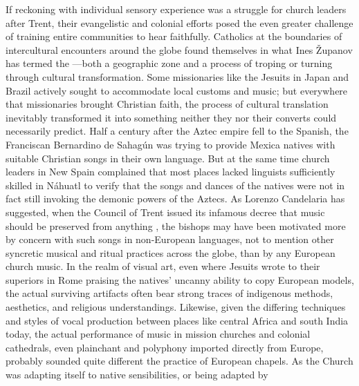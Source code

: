 If reckoning with individual sensory experience was a struggle for church
leaders after Trent, their evangelistic and colonial efforts posed the even
greater challenge of training entire communities to hear faithfully.
Catholics at the boundaries of intercultural encounters around the globe found
themselves in what Ines Županov has termed the ---both a geographic zone and a process of troping or turning through
cultural transformation.%
    \Autocite{Zupanov:MissionaryTropics}
Some missionaries like the Jesuits in Japan and Brazil actively sought to
accommodate local customs and music; but everywhere that missionaries brought
Christian faith, the process of cultural translation inevitably transformed it
into something neither they nor their converts could necessarily predict.%
    \Autocites
    {Bailey:Art}
    {Fromont:DancingKingCongo}
    {Waterhouse:EarliestJapaneseContacts}
    {Castagna:JesuitsConversionBrazil}
Half a century after the Aztec empire fell to the Spanish, the Franciscan
Bernardino de Sahagún was trying to provide Mexica natives with suitable
Christian songs in their own language.
But at the same time church leaders in New Spain complained that most places
lacked linguists sufficiently skilled in Náhuatl to verify that the songs and
dances of the natives were not in fact still invoking the demonic powers of the
Aztecs.%
    \Autocite[637]{Candelaria:Psalmodia}
As Lorenzo Candelaria has suggested, when the Council of Trent issued its
infamous decree that music should be preserved from anything , the bishops may have been motivated more by concern with such songs
in non-European languages, not to mention other syncretic musical and ritual
practices across the globe, than by any European church music.%
    \Autocite[637--638]{Candelaria:Psalmodia}
In the realm of visual art, even where Jesuits wrote to their superiors in Rome
praising the natives' uncanny ability to copy European models, the actual
surviving artifacts often bear strong traces of indigenous methods, aesthetics,
and religious understandings.%
    \Autocite[27--29, 34]{Bailey:Art}
Likewise, given the differing techniques and styles of vocal production between
places like central Africa and south India today, the actual performance of
music in mission churches and colonial cathedrals, even plainchant and polyphony
imported directly from Europe, probably sounded quite different the practice of
European chapels.%
    \Autocite[XXX]{Kendrick:Jeremiah} %
As the Church was adapting itself to native sensibilities, or being adapted by
